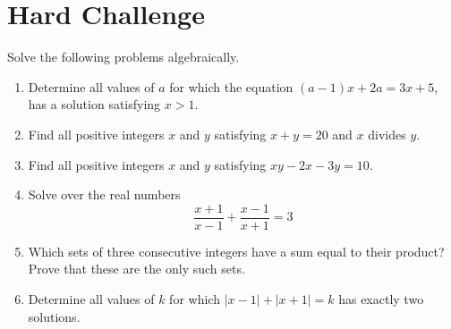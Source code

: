 	\section{Hard Challenge}
	
	Solve the following problems algebraically.
	
	\begin{enumerate}
		\item
		Determine all values of $a$ for which the equation $(a-1)x+2a=3x+5$, has a solution satisfying $x>1$.
		
		\item
		Find all positive integers $x$ and $y$ satisfying $x+y=20$ and $x$ divides $y$.
		
		\item
		Find all positive integers $x$ and $y$ satisfying $xy-2x-3y=10$.
		
		\item
		Solve over the real numbers \[\frac{x+1}{x-1}+\frac{x-1}{x+1}=3\]
		
		\item
		Which sets of three consecutive integers have a sum equal to their product? Prove that these are the only such sets.
		
		\item
		Determine all values of $k$ for which $|x-1|+|x+1|=k$ has exactly two solutions.
	\end{enumerate}
	
	\newpage
	
	\setcounter{section}{0}
	
	\setlength{\columnseprule}{0.4pt}
	
